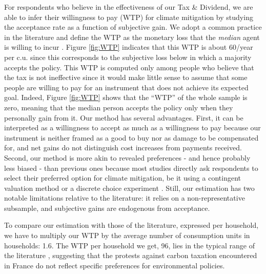 \documentclass[12pt]{article} %
\begin{document}
\begin{appendices}
For respondents who believe in the effectiveness of our Tax \& Dividend, we are able to infer their willingness to pay (WTP) for climate mitigation by studying the acceptance rate as a function of subjective gain. We adopt a common practice in the literature and define the WTP as the monetary loss that the \textit{median} agent is willing to incur \citep{hanemann_welfare_1984}. Figure \ref{fig:WTP} indicates that this WTP is about 60\euros{}/year per c.u. since this corresponds to the subjective loss below in which a majority accepts the policy. This WTP is computed only among people who believe that the tax is not ineffective since it would make little sense to assume that some people are willing to pay for an instrument that does not achieve its expected goal. Indeed, Figure \ref{fig:WTP} shows that the ``WTP'' of the whole sample is zero, meaning that the median person accepts the policy only when they personally gain from it. Our method has several advantages. First, it can be interpreted as a willingness to accept as much as a willingness to pay because our instrument is neither framed as a good to buy nor as damage to be compensated for, and net gains do not distinguish cost increases from payments received. Second, our method is more akin to revealed preferences - and hence probably less biased \citep{murphy_meta-analysis_2005} - than previous ones because most studies directly ask respondents to select their preferred option for climate mitigation, be it using a contingent valuation method \citep{berrens_information_2004,cameron_individual_2005,kotchen_willingness--pay_2013} or a discrete choice experiment \citep{longo_internalization_2008,alberini_preferences_2018}. Still, our estimation has two notable limitations relative to the literature: it relies on a non-representative subsample, and subjective gains are endogenous from acceptance. 

To compare our estimation with those of the literature, expressed per household, we have to multiply our WTP by the average number of consumption units in households: 1.6. The WTP per household we get, 96\euros{}, lies in the typical range of the literature \citep{jenkins_political_2014,streimikiene_review_2019}, suggesting that the protests against carbon taxation encountered in France do not reflect specific preferences for environmental policies.


\end{appendices}
\end{document}
